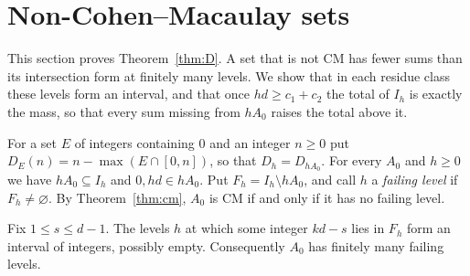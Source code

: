 \section{Non-Cohen--Macaulay sets}\label{sec:noncm}

This section proves Theorem~\ref{thm:D}. A set that is not CM has fewer sums than its intersection form at finitely many levels. We show that in each residue class these levels form an interval, and that once $hd\ge c_1+c_2$ the total of $I_h$ is exactly the mass, so that every sum missing from $hA_0$ raises the total above it.

For a set $E$ of integers containing $0$ and an integer $n\ge0$ put $D_E(n)=n-\max(E\cap[0,n])$, so that $D_h=D_{hA_0}$. For every $A_0$ and $h\ge0$ we have $hA_0\subseteq I_h$ and $0,hd\in hA_0$. Put $F_h=I_h\setminus hA_0$, and call $h$ a \emph{failing level} if $F_h\neq\varnothing$. By Theorem~\ref{thm:cm}, $A_0$ is CM if and only if it has no failing level.

\begin{proposition}\label{prop:failing-interval}
Fix $1\le s\le d-1$. The levels $h$ at which some integer $kd-s$ lies in $F_h$ form an interval of integers, possibly empty. Consequently $A_0$ has finitely many failing levels.
\end{proposition}

